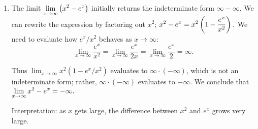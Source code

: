 \begin{example}
\begin{enumerate}[1)]
\item	The limit $\displaystyle \lim_{x\to\infty} \big( x^2-e^x \big)$ initially returns the indeterminate form $\infty-\infty$. We can rewrite the expression by factoring out $x^2$; $\displaystyle x^2-e^x = x^2\left(1-\frac{e^x}{x^2}\right).$ We need to evaluate how $e^x/x^2$ behaves as $x\rightarrow \infty$:
$$\lim_{x\to\infty}\frac{e^x}{x^2} = \lim_{x\to\infty} \frac{e^x}{2x} = \lim_{x\to\infty} \frac{e^x}{2} = \infty.$$

Thus $\lim_{x\to\infty}x^2(1-e^x/x^2)$ evaluates to $\infty\cdot(-\infty)$, which is not an indeterminate form; rather, $\infty\cdot(-\infty)$ evaluates to $-\infty$. We conclude that 
$\displaystyle \lim_{x\to\infty} x^2-e^x = -\infty.$

Interpretation: as $x$ gets large, the difference between $x^2$ and $e^x$ grows very large.
\end{enumerate}
\end{example}